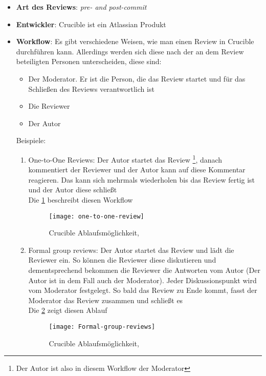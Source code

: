 \begin{itemize}
	\item \textbf{Art des Reviews}: \textit{pre- and post-commit}
	\item \textbf{Entwickler}: Crucible ist ein Atlassian Produkt
	\item \textbf{Workflow}: Es gibt verschiedene Weisen, wie man einen Review in Crucible durchführen kann. Allerdings werden sich diese nach der an dem Review beteiligten Personen
		 unterscheiden, diese sind:
		\begin{itemize}
			\item Der Moderator. Er ist die Person, die das Review startet und für das Schließen des Reviews verantwortlich ist
			\item Die Reviewer
			\item Der Autor
		\end{itemize}
		Beispiele:
		
		\begin{enumerate}
			\item One-to-One Reviews: Der Autor startet das Review \footnote{Der Autor ist also in diesem Workflow der Moderator}, danach kommentiert der Reviewer und der Autor kann auf diese
				Kommentar reagieren. Das kann sich mehrmals wiederholen bis das Review fertig ist und der Autor diese schließt\\
				Die \cref{fig:one-to-one-workflow} beschreibt diesen Workflow
				\begin{figure}[H]
					\centering
					\texttt{[image: one-to-one-review]}
					\caption[Crucible: one-to-one-review]{Crucible Ablaufsmöglichkeit,\\ \cite{Crucible}}
					\label{fig:one-to-one-workflow}
				\end{figure}
				
			\item Formal group reviews: Der Autor startet das Review und lädt die Reviewer ein. So können die Reviewer diese diskutieren und dementsprechend bekommen die Reviewer 
				die Antworten vom Autor (Der Autor ist in dem Fall auch der Moderator). Jeder Diskussionspunkt wird vom Moderator festgelegt. So bald das Review zu Ende kommt,
				fasst der Moderator das Review zusammen und schließt es\\
				Die \cref{fig:Formal-group-review} zeigt diesen Ablauf
				\begin{figure}[H]
					\centering
					\texttt{[image: Formal-group-reviews]}
					\caption[Crucible: Formal group review]{Crucible Ablaufsmöglichkeit,\\ \cite{Crucible}}
					\label{fig:Formal-group-review}
				\end{figure}
		\end{enumerate}
		
\end{itemize}


